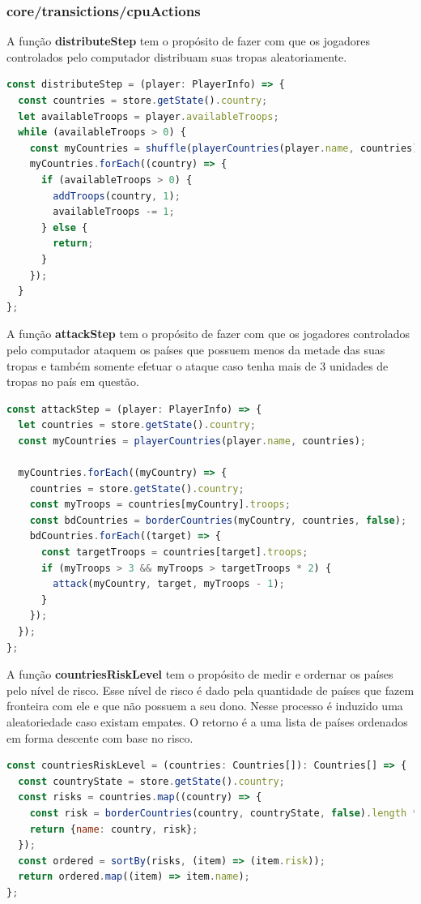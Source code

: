 \documentclass[rel_mlp]{iiufrgs}
\begin{document}
\subsubsection{core/transictions/cpuActions}

A função \textbf{distributeStep} tem o propósito de fazer com que os jogadores controlados pelo computador distribuam suas tropas aleatoriamente.
\begin{lstlisting}[language=JavaScript]
const distributeStep = (player: PlayerInfo) => {
  const countries = store.getState().country;
  let availableTroops = player.availableTroops;
  while (availableTroops > 0) {
    const myCountries = shuffle(playerCountries(player.name, countries));
    myCountries.forEach((country) => {
      if (availableTroops > 0) {
        addTroops(country, 1);
        availableTroops -= 1;
      } else {
        return;
      }
    });
  }
};
\end{lstlisting}

A função \textbf{attackStep} tem o propósito de fazer com que os jogadores controlados pelo computador ataquem os países que possuem menos da metade das suas tropas e também somente efetuar o ataque caso tenha mais de 3 unidades de tropas no país em questão.
\begin{lstlisting}[language=JavaScript]
const attackStep = (player: PlayerInfo) => {
  let countries = store.getState().country;
  const myCountries = playerCountries(player.name, countries);

  myCountries.forEach((myCountry) => {
    countries = store.getState().country;
    const myTroops = countries[myCountry].troops;
    const bdCountries = borderCountries(myCountry, countries, false);
    bdCountries.forEach((target) => {
      const targetTroops = countries[target].troops;
      if (myTroops > 3 && myTroops > targetTroops * 2) {
        attack(myCountry, target, myTroops - 1);
      }
    });
  });
};
\end{lstlisting}

A função \textbf{countriesRiskLevel} tem o propósito de medir e ordernar os países pelo nível de risco.
Esse nível de risco é dado pela quantidade de países que fazem fronteira com ele e que não possuem a seu dono.
Nesse processo é induzido uma aleatoriedade caso existam empates.
O retorno é a uma lista de países ordenados em forma descente com base no risco.
\begin{lstlisting}[language=JavaScript]
const countriesRiskLevel = (countries: Countries[]): Countries[] => {
  const countryState = store.getState().country;
  const risks = countries.map((country) => {
    const risk = borderCountries(country, countryState, false).length * 1000 + Math.abs(Math.random() * 999);
    return {name: country, risk};
  });
  const ordered = sortBy(risks, (item) => (item.risk));
  return ordered.map((item) => item.name);
};
\end{lstlisting}
\end{document}
